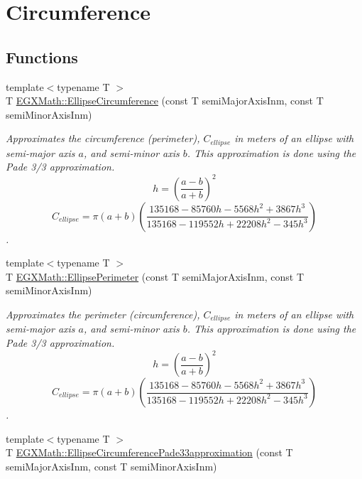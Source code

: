 \hypertarget{group___e_g_x_math-_geometry-2_d-_ellipse-_circumference}{}\section{Circumference}
\label{group___e_g_x_math-_geometry-2_d-_ellipse-_circumference}
\subsection*{Functions}
\begin{DoxyCompactItemize}
\item 
{\footnotesize template$<$typename T $>$ }\\T \mbox{\hyperlink{group___e_g_x_math-_geometry-2_d-_ellipse-_circumference_ga4172802ac674eb53467b44928ac635c7}{E\+G\+X\+Math\+::\+Ellipse\+Circumference}} (const T semi\+Major\+Axis\+Inm, const T semi\+Minor\+Axis\+Inm)
\begin{DoxyCompactList}\small\item\em Approximates the circumference (perimeter), $C_{ellipse}$ in meters of an ellipse with semi-\/major axis $a$, and semi-\/minor axis $b$. This approximation is done using the Pade 3/3 approximation. \[ h=\left( \frac{a-b}{a+b} \right)^2 \] \[ C_{ellipse}=\pi (a + b) \left( \frac{135168-85760 h-5568 h^2+ 3867 h^3}{135168-119552 h+ 22208 h^2 - 345h^3} \right) \]. \end{DoxyCompactList}\item 
{\footnotesize template$<$typename T $>$ }\\T \mbox{\hyperlink{group___e_g_x_math-_geometry-2_d-_ellipse-_circumference_ga2d4ee70e08d6fb4b56209ad4fc3f38ca}{E\+G\+X\+Math\+::\+Ellipse\+Perimeter}} (const T semi\+Major\+Axis\+Inm, const T semi\+Minor\+Axis\+Inm)
\begin{DoxyCompactList}\small\item\em Approximates the perimeter (circumference), $C_{ellipse}$ in meters of an ellipse with semi-\/major axis $a$, and semi-\/minor axis $b$. This approximation is done using the Pade 3/3 approximation. \[ h=\left( \frac{a-b}{a+b} \right)^2 \] \[ C_{ellipse}=\pi (a + b) \left( \frac{135168-85760 h-5568 h^2+ 3867 h^3}{135168-119552 h+ 22208 h^2 - 345h^3} \right) \]. \end{DoxyCompactList}\item 
{\footnotesize template$<$typename T $>$ }\\T \mbox{\hyperlink{group___e_g_x_math-_geometry-2_d-_ellipse-_circumference_ga0e0b290f1da2605c16ec13b9e221769d}{E\+G\+X\+Math\+::\+Ellipse\+Circumference\+Pade33approximation}} (const T semi\+Major\+Axis\+Inm, const T semi\+Minor\+Axis\+Inm)

\end{DoxyCompactItemize}
